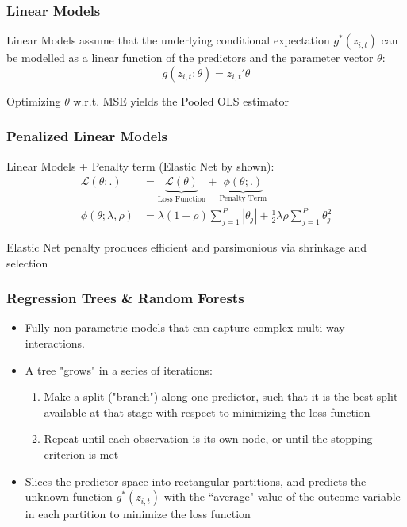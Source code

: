 \documentclass[]{beamer}
\begin{document}
\begin{frame}
\frametitle{Linear Models}
Linear Models assume that the underlying conditional expectation \( g^*(z_{i, t}) \) can be modelled as a linear function of the predictors and the parameter vector \( \theta \):
	\begin{equation}
	g(z_{i, t};\theta) = z_{i, t}' \theta
	\end{equation}
	
Optimizing $\theta$ w.r.t. MSE yields the Pooled OLS estimator
\end{frame}


\begin{frame}
\frametitle{Penalized Linear Models}
Linear Models + Penalty term (Elastic Net by \cite{zou_regularization_2005} shown):
	\begin{align}
	\mathcal{L(\theta;.)} &= 
		\underset{\text{Loss Function}}{\underbrace{\mathcal{L(\theta)}}} + 
		\underset{\text{Penalty Term}}{\underbrace{\phi(\theta;.)}} \\
	\phi(\theta;\lambda,\rho) &= 
		\lambda(1-\rho) \sum_{j = 1}^{P}|\theta_j| +
		\frac{1}{2} \lambda \rho \sum_{j = 1}^{P}\theta_j^2
	\end{align}

Elastic Net penalty produces efficient and parsimonious via shrinkage and selection
	
\end{frame}


\begin{frame}
\frametitle{Regression Trees \& Random Forests}
\begin{itemize}
	\item Fully non-parametric models that can capture complex multi-way interactions. 
	\item A tree "grows" in a series of iterations:
	\begin{enumerate}
		\item Make a split ("branch") along one predictor, such that it is the best split available at that stage with respect to minimizing the loss function
		\item Repeat until each observation is its own node, or until the stopping criterion is met
	\end{enumerate}
	\item Slices the predictor space into rectangular partitions, and predicts the unknown function $g^*(z_{i,t})$ with the ``average" value of the outcome variable in each partition to minimize the loss function
\end{itemize}
\end{frame}
\end{document}
